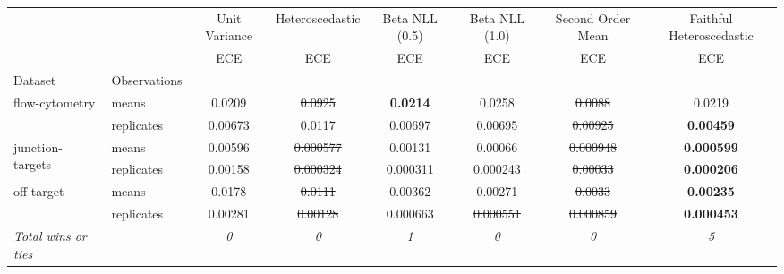 \begin{tabular}{ll|c|c|c|c|c|c}
\toprule
{} & {} & {Unit Variance} & {Heteroscedastic} & {Beta NLL (0.5)} & {Beta NLL (1.0)} & {Second Order Mean} & {Faithful Heteroscedastic} \\
{} & {} & {ECE} & {ECE} & {ECE} & {ECE} & {ECE} & {ECE} \\
{Dataset} & {Observations} & {} & {} & {} & {} & {} & {} \\
\midrule
\multirow[t]{2}{*}{flow-cytometry} & means & 0.0209 & \sout{0.0925} & \textbf{0.0214} & 0.0258 & \sout{0.0088} & 0.0219 \\
 & replicates & 0.00673 & 0.0117 & 0.00697 & 0.00695 & \sout{0.00925} & \textbf{0.00459} \\
\multirow[t]{2}{*}{junction-targets} & means & 0.00596 & \sout{0.000577} & 0.00131 & 0.00066 & \sout{0.000948} & \textbf{0.000599} \\
 & replicates & 0.00158 & \sout{0.000324} & 0.000311 & 0.000243 & \sout{0.00033} & \textbf{0.000206} \\
\multirow[t]{2}{*}{off-target} & means & 0.0178 & \sout{0.0111} & 0.00362 & 0.00271 & \sout{0.0033} & \textbf{0.00235} \\
 & replicates & 0.00281 & \sout{0.00128} & 0.000663 & \sout{0.000551} & \sout{0.000859} & \textbf{0.000453} \\
\textit{{Total wins or ties}} &  & \textit{0} & \textit{0} & \textit{1} & \textit{0} & \textit{0} & \textit{5} \\
\bottomrule
\end{tabular}
